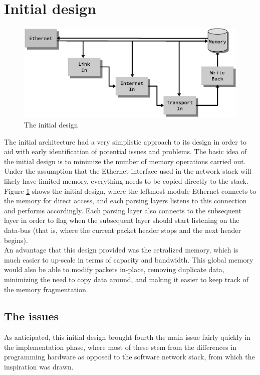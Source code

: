 \section{Initial design}

\begin{figure}
    \centering
    \includegraphics[scale=0.45]{design/design_0.eps}
    \caption{The initial design}
    \label{fig:initial_design}
\end{figure}

The initial architecture had a very simplistic approach to its design in order 
to aid with early identification of potential issues and problems. 
The basic idea of the initial design is to minimize the number of memory 
operations carried out. Under the assumption that the Ethernet interface used in the network 
stack will likely have limited memory, everything needs to be copied directly to
the stack. Figure \ref{fig:initial_design} shows the initial design, where the 
leftmost module Ethernet connects to the memory for direct access, and each 
parsing layers listens to this connection and performs accordingly. Each parsing 
layer also connects to the subsequent layer in order to flag when the subsequent
layer should start listening on the data-bus (that is, where the current packet
header stops and the next header begins).\\
An advantage that this design provided was the cetralized memory, which is much 
easier to up-scale in terms of capacity and bandwidth. This global memory would 
also be able to modify packets in-place, removing duplicate data, minimizing the 
need to copy data around, and making it easier to keep track of the memory 
fragmentation.

\subsection{The issues}
As anticipated, this initial design brought fourth the main issue fairly quickly 
in the implementation phase, where most of these stem from the differences in 
programming hardware as opposed to the software network stack, from which the 
inspiration was drawn.

